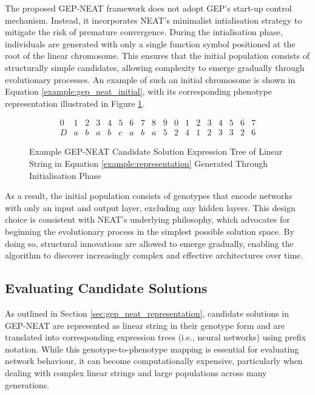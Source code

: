 \parbreak\noindent The proposed GEP-NEAT framework does not adopt GEP's start-up control mechanism. Instead, it incorporates NEAT's minimalist intialisation strategy to mitigate the risk of premature convergence. During the intialisation phase, individuals are generated with only a single function symbol positioned at the root of the linear chromosome. This ensures that the initial population consists of structurally simple candidates, allowing complexity to emerge gradually through evolutionary processes. An example of such an initial chromosome is shown in Equation \ref{example:gep_neat_initial}, with its corresponding phenotype representation illustrated in Figure \ref{fig:gep_neat_initial_example}.
\begin{ceqn}
	\begin{equation}\label{example:gep_neat_initial}
		\begin{array}{cccccccccccccccccc}
			0 & 1 & 2 & 3 & 4 & 5 & 6 & 7 & 8 & 9 & 0 & 1 & 2 & 3 & 4 & 5 & 6 & 7 \\
			D & a & b & a & b & c & a & b & a & 5 & 2 & 4 & 1 & 2 & 3 & 3 & 2 & 6
		\end{array}
	\end{equation}
\end{ceqn}

\parbreak
\begin{figure}[H] %
	\centering %
	\caption{Example GEP-NEAT Candidate Solution Expression Tree of Linear String in Equation \ref{example:representation} Generated Through Initialisation Phase}
	\label{fig:gep_neat_initial_example} %
\end{figure}

\parbreak\noindent As a result, the initial population consists of genotypes that encode networks with only an input and output layer, excluding any hidden layers. This design choice is consistent with NEAT's underlying philosophy, which advocates for beginning the evolutionary process in the simplest possible solution space. By doing so, structural innovations are allowed to emerge gradually, enabling the algorithm to discover increasingly complex and effective architectures over time.

\subsection{Evaluating Candidate Solutions}
As outlined in Section \ref{sec:gep_neat_representation}, candidate solutions in GEP-NEAT are represented as linear string in their genotype form and are translated into corresponding expression trees (i.e., neural networks) using prefix notation. While this genotype-to-phenotype mapping is essential for evaluating network behaviour, it can become computationally expensive, particularly when dealing with complex linear strings and large populations across many generations.

